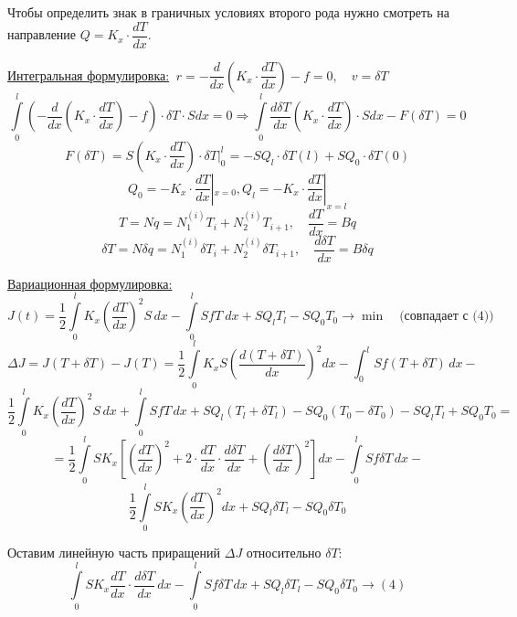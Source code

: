 \documentclass{bmstu}
\begin{document}
	Чтобы определить знак в граничных условиях второго рода нужно смотреть на направление $Q=K_x \cdot  \dfrac{dT}{dx}$.
	
	\underline{Интегральная формулировка:} $ \ r=-\dfrac{d}{dx}(K_x \cdot \dfrac{dT}{dx}) - f = 0, \quad v = \delta T $
	\begin{equation}
	\int\limits_0^l (-\frac{d}{dx}(K_x \cdot \frac{dT}{dx}) - f) \cdot \delta T \cdot S dx = 0 \Rightarrow \int\limits_0^l  \frac{d\delta T}{dx}(K_x \cdot \frac{dT}{dx}) \cdot S dx - F(\delta T) = 0
	\end{equation}
	\[
	 F(\delta T) = S(K_x \cdot \frac{dT}{dx})\cdot \delta T |_0^l = -SQ_l \cdot \delta T(l) + SQ_0 \cdot\delta T(0)
	 \]
	 \[  Q_0 = -K_x \cdot \frac{dT}{dx} |_{x=0}, Q_l = -K_x \cdot \frac{dT}{dx} |_{x=l}
	\]
	\[
	T= Nq = N_1^{(i)}T_i +  N_2^{(i)}T_{i+1}, \quad \frac{dT}{dx}=Bq
	\]
	\[ 	\delta T= N\delta q = N_1^{(i)}\delta T_i +  N_2^{(i)}\delta T_{i+1}, \quad \frac{d\delta T}{dx}=B\delta q
	\]
	
	\underline{Вариационная формулировка:}
	\[
		J(t) = \frac{1}{2} \int\limits_0^{l} K_x \left( \frac{dT}{dx} \right)^2 S \, dx - \int\limits_0^{l} SfT \ dx + S Q_l T_l - S Q_0 T_0 \rightarrow \min \quad \text{(совпадает с (4))} 
	\]
	\[
		\Delta J = J(T + \delta T) - J(T) = \frac{1}{2} \int\limits_0^{l} K_x S \left( \frac{d(T + \delta T)}{dx} \right)^2 dx - \int_0^{l} S f (T + \delta T) \, dx -
	\]
	\[  
		 \frac{1}{2} \int\limits_0^{l} K_x \left( \frac{dT}{dx} \right)^2 S \, dx +
		 \int\limits_0^{l} S f T \, dx + S Q_l (T_l + \delta T_l) - S Q_0 (T_0 -\delta T_0) -
		 S Q_l T_l + S Q_0 T_0 =
	\] 
	\[
		= \frac{1}{2} \int\limits_0^{l} S K_x \left[ \left( \frac{dT}{dx} \right)^2 + 2 \cdot \frac{dT}{dx} \cdot \frac{d \delta T}{dx} + \left( \frac{d \delta T}{dx} \right)^2 \right] dx - \int\limits_0^{l} S f \delta T \, dx -
	\]
	\[ \frac{1}{2} \int\limits_0^{l} S K_x \left( \frac{dT}{dx} \right)^2 dx + S Q_l \delta T_l - S Q_0 \delta T_0 
	\]
	
	Оставим линейную часть приращений $\Delta J$ относительно $\delta T$:
	\[
		\int\limits_0^{l} S K_x \frac{dT}{dx}\cdot \frac{d \delta T}{dx} \, dx - \int\limits_0^{l} S f \delta T \, dx + S Q_l \delta T_l - S Q_0 \delta T_0 \rightarrow (4)
	\]
	
\end{document}
